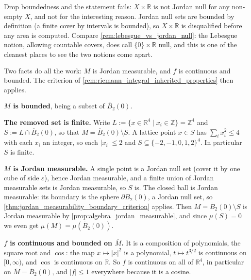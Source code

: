\begin{exercisesolution}
\begin{remark}
Drop boundedness and the statement fails: $X \times \mathbb{R}$ is not Jordan null for any
non-empty $X$, and not for the interesting reason. Jordan null sets are bounded by definition
(a finite cover by intervals is bounded), so $X \times \mathbb{R}$ is disqualified before any
area is computed. Compare \cref{rem:lebesgue_vs_jordan_null}: the Lebesgue notion, allowing
countable covers, does call $\{0\}\times\mathbb{R}$ null, and this is one of the cleanest places
to see the two notions come apart.
\end{remark}
\end{exercisesolution}

\begin{exercisesolution}
\label{sol:kobel_ball_minus_lattice}
Two facts do all the work: $M$ is Jordan measurable, and $f$ is continuous and bounded. The
criterion of \cref{rem:riemann_integral_inherited_properties} then applies.

\textbf{$M$ is bounded}, being a subset of $\overline{B}_2(0)$.

\textbf{The removed set is finite.} Write $L := \{x \in \mathbb{R}^4 \mid x_i \in \mathbb{Z}\}
= \mathbb{Z}^4$ and $S := L \cap \overline{B}_2(0)$, so that $M = \overline{B}_2(0)\setminus S$. A
lattice point $x \in S$ has $\sum_i x_i^2 \le 4$ with each $x_i$ an integer, so each $|x_i| \le 2$
and $S \subseteq \{-2,-1,0,1,2\}^4$. In particular $S$ is finite.

\textbf{$M$ is Jordan measurable.} A single point is a Jordan null set (cover it by one cube of
side $\varepsilon$), hence Jordan measurable, and a finite union of Jordan measurable sets is
Jordan measurable, so $S$ is. The closed ball is Jordan measurable: its boundary is the sphere
$\partial B_2(0)$, a Jordan null set, so
\cref{thm:jordan_measurability_boundary_criterion} applies. Then
$M = \overline{B}_2(0)\setminus S$ is Jordan measurable by
\cref{prop:algebra_jordan_measurable}, and since $\mu(S) = 0$ we even get
$\mu(M) = \mu(\overline{B}_2(0))$.

\textbf{$f$ is continuous and bounded on $\overline{M}$.} It is a composition of polynomials, the
square root and $\cos$: the map $x \mapsto |x|^2$ is a polynomial, $t \mapsto t^{3/2}$ is
continuous on $[0,\infty)$, and $\cos$ is continuous on $\mathbb{R}$. So $f$ is continuous on all
of $\mathbb{R}^4$, in particular on $\overline{M} = \overline{B}_2(0)$, and
$\lvert f\rvert \le 1$ everywhere because it is a cosine.


\end{exercisesolution}
